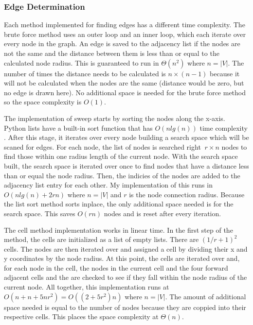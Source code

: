 \documentclass{article}
\begin{document}
        \subsubsection{Edge Determination}
        Each method implemented for finding edges has a different time complexity. The brute force method uses an outer loop and an inner loop, which each iterate over every node in the graph. An edge is saved to the adjacency list if the nodes are not the same and the distance between them is less than or equal to the calculated node radius. This is guaranteed to run in $\Theta\left(n^2\right)$ where $n = |V|$. The number of times the distance needs to be calculated is $n \times (n-1)$ because it will not be calculated when the nodes are the same (distance would be zero, but no edge is drawn here). No additional space is needed for the brute force method so the space complexity is $O(1)$.
        \par
        The implementation of sweep starts by sorting the nodes along the x-axis. Python lists have a built-in sort function that has $O\left(n lg(n)\right)$ time complexity \cite{listsort}. After this stage, it iterates over every node building a search space which will be scaned for edges. For each node, the list of nodes is searched right $~r\times n$ nodes to find those within one radius length of the current node. With the search space built, the search space is iterated over once to find nodes that have a distance less than or equal the node radius. Then, the indicies of the nodes are added to the adjacency list entry for each other. My implementation of this runs in $O\left(n lg(n) + 2rn\right)$ where $n = |V|$ and $r$ is the node connection radius. Because the list sort method sorts inplace, the only additional space needed is for the search space. This saves $O(rn)$ nodes and is reset after every iteration.
        \par
        The cell method implementation works in linear time. In the first step of the method, the cells are initialized as a list of empty lists. There are $(1/r + 1)^2$ cells. The nodes are then iterated over and assigned a cell by dividing their x and y coordinates by the node radius. At this point, the cells are iterated over and, for each node in the cell, the nodes in the current cell and the four forward adjacent cells and the are checked to see if they fall within the node radius of the current node. All together, this implementation runs at $O\left(n + n + 5nr^2\right) = O\left((2 + 5r^2)n\right)$ where $n = |V|$. The amount of additional space needed is equal to the number of nodes because they are coppied into their respective cells. This places the space complexity at $\Theta(n)$.
\end{document}
